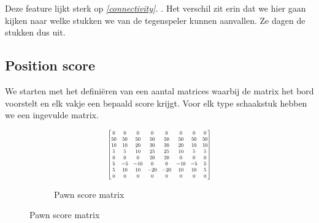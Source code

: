 \documentclass[a4paper,openany]{uantwerpenassignment}
\newcommand{\reference}[1]{\textit{\ref{#1}. \nameref{#1}}}
\newcommand\scalemath[2]{\scalebox{#1}{\mbox{\ensuremath{\displaystyle #2}}}}
\begin{document}
Deze feature lijkt sterk op \reference{connectivity}. Het verschil zit erin dat we hier gaan kijken naar welke stukken we van de tegenspeler kunnen aanvallen. Ze dagen de stukken dus uit. 

\pagebreak

\subsection{Position score}
We starten met het definiëren van een aantal matrices waarbij de matrix het bord voorstelt en elk vakje een bepaald score krijgt. Voor elk type schaakstuk hebben we een ingevulde matrix.

\begin{figure}[h]
    \centering
    \begin{subfigure}{.3\textwidth}
        $$
		\scalemath{0.6}{
		\begin{bmatrix}
		0& 0& 0& 0& 0& 0& 0& 0\\
		50& 50& 50& 50& 50& 50& 50& 50\\
		10& 10& 20& 30& 30& 20& 10& 10\\
		5& 5& 10& 25& 25& 10& 5& 5\\
		0& 0& 0& 20& 20& 0& 0& 0\\
		5& -5& -10& 0& 0& -10& -5& 5\\
		5& 10& 10& -20& -20& 10& 10& 5\\
		0& 0& 0& 0& 0& 0& 0& 0
		\end{bmatrix}}
		$$
        \caption{Pawn score matrix}


\end{subfigure}
\end{figure}
\end{document}
